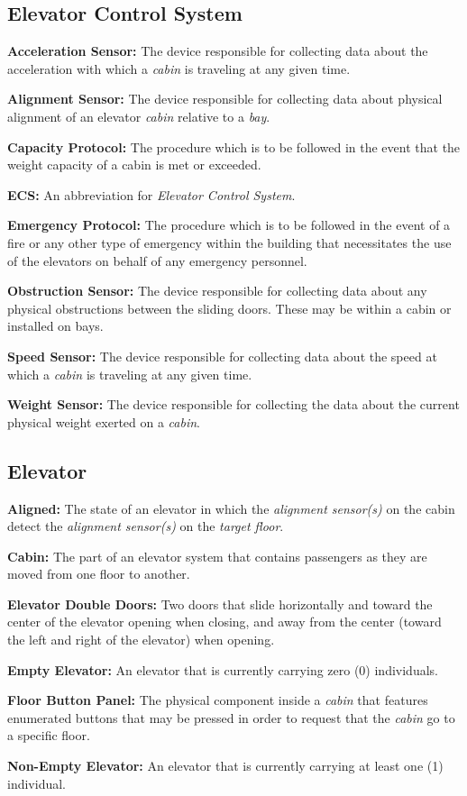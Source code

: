 \documentclass[12pt]{article}
\begin{document}
\subsection{Elevator Control System}
\begin{list}{•}{•}
	\item \textbf{Acceleration Sensor:} The device responsible for collecting data about the 
	acceleration with which a \textit{cabin} is traveling at any given time.
	\item \textbf{Alignment Sensor:} The device responsible for collecting data about physical 
	alignment of an elevator \textit{cabin} relative to a \textit{bay}.
	\item \textbf{Capacity Protocol:} The procedure which is to be followed in the event that the 
	weight capacity of a cabin is met or exceeded.
	\item \textbf{ECS:} An abbreviation for \textit{Elevator Control System}.
	\item \textbf{Emergency Protocol:} The procedure which is to be followed in the event of a fire or 
	any other type of emergency within the building that necessitates the use of the elevators on 
	behalf of any emergency personnel.
	\item \textbf{Obstruction Sensor:} The device responsible for collecting data about any physical 
	obstructions between the sliding doors. These may be within a cabin or installed on bays.
	\item \textbf{Speed Sensor:} The device responsible for collecting data about the speed at which 
	a \textit{cabin} is traveling at any given time.
	\item \textbf{Weight Sensor:} The device responsible for collecting the data about the current 
	physical weight exerted on a \textit{cabin}.
	
\end{list}
\subsection{Elevator}
\begin{list}{•}{•}
	\item \textbf{Aligned:} The state of an elevator in which the \textit{alignment sensor(s)} on the 
	cabin detect the \textit{alignment sensor(s)} on the \textit{target floor}.  	
  	\item \textbf{Cabin:} The part of an elevator system that contains passengers as they are moved 
  	from one floor to another.
	\item \textbf{Elevator Double Doors:} Two doors that slide horizontally and toward the center of 
	the elevator opening when closing, and away from the center (toward the left and right of the 
	elevator) when opening.
	\item \textbf{Empty Elevator:} An elevator that is currently carrying zero (0) individuals.
	\item \textbf{Floor Button Panel:} The physical component inside a \textit{cabin} that features 
	enumerated buttons that may be pressed in order to request that the \textit{cabin} go to a 
	specific floor.
	\item \textbf{Non-Empty Elevator:} An elevator that is currently carrying at least one (1) 
	individual.
\end{list}
\end{document}
